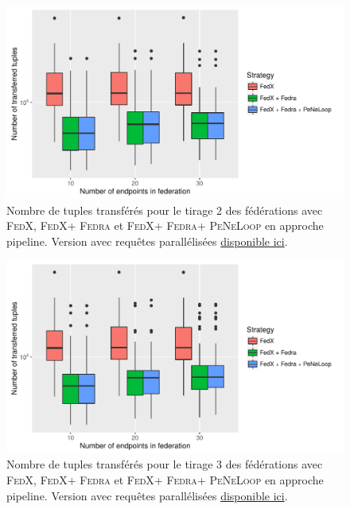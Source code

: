 \documentclass[a4paper]{article}
\def\fedra{\textsc{Fedra}\xspace}
\def\fedx{\textsc{FedX}\xspace}
\def\peneloop{\textsc{PeNeLoop}\xspace}
\newcommand{\parallelLink}[1]{Version avec requêtes parallélisées \href{#1}{disponible ici}.}
\begin{document}
\begin{figure}[h]
    \centering
    \includegraphics{boxplots/fed2_transferred_tuples.pdf}
    \caption{Nombre de tuples transférés pour le tirage 2 des fédérations avec \fedx, \fedx + \fedra et \fedx + \fedra + \peneloop en approche pipeline. \parallelLink{https://github.com/Callidon/ParallelNestedLoop/blob/master/results/definitive/fed2_pll_transferred_tuples.pdf}}
    \label{fig:fed2_tuples}
\end{figure}

\begin{figure}[h]
    \centering
    \includegraphics{boxplots/fed3_transferred_tuples.pdf}
    \caption{Nombre de tuples transférés pour le tirage 3 des fédérations avec \fedx, \fedx + \fedra et \fedx + \fedra + \peneloop en approche pipeline. \parallelLink{https://github.com/Callidon/ParallelNestedLoop/blob/master/results/definitive/fed3_pll_transferred_tuples.pdf}}
    \label{fig:fed3_tuples}
\end{figure}
\end{document}
